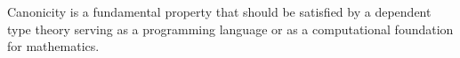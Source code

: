 \noindent
Canonicity is a fundamental property that should be satisfied by a dependent type theory serving as
a programming language or as a computational foundation for mathematics.

